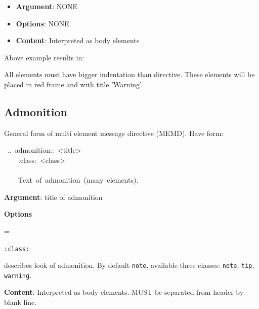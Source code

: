 \documentclass[12pt]{article}
\newenvironment{deflist}[1]{%
\begin{list}{}
{\renewcommand{\makelabel}[1]{\textbf{##1}\hfill}
\settowidth{\labelwidth}{\textbf{#1}}
\leftmargin=\labelwidth
\advance \leftmargin\labelsep}}
{\end{list}}
\begin{document}
\begin{itemize}
\item
\textbf{Argument}: NONE

\item
\textbf{Options}: NONE

\item
\textbf{Content}: Interpreted as body elements
\end{itemize}

Above example results in:

\begin{center}
\end{center}

All elements must have bigger indentation than directive. These
elements will be placed in red frame and with title 'Warning'.

\hypertarget{ladmonition}{}
\subsection{Admonition}

General form of multi element message directive (MEMD). Have form:

\begin{ttfamily}\begin{flushleft}
\mbox{~..~admonition::~<title>}\\
\mbox{~~~~:class:~<class>}\\
\mbox{}\\
\mbox{~~~~Text~of~admonition~(many~elements).}\\
\end{flushleft}\end{ttfamily}

\begin{itemize}
\item
\textbf{Argument}: title of admonition

\item
\textbf{Options}

 \begin{deflist}{iii}

\item[ \texttt{:class:}]

describes look of admonition. By default \texttt{note}, available three
classes: \texttt{note}, \texttt{tip}, \texttt{warning}.
\end{deflist}

\item
\textbf{Content}: Interpreted as body elements. MUST be separated from header by
blank line.
\end{itemize}
\end{document}
